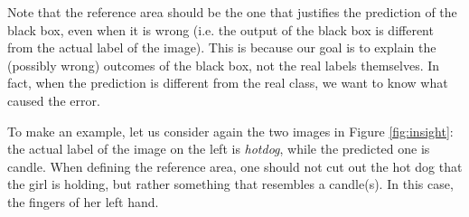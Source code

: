 \documentclass[12pt, twoside, a4paper]{report}
\begin{document}
Note that the reference area should be the one that justifies the prediction of the black box, even when it is wrong (i.e. the output of the black box is different from the actual label of the image). This is because our goal is to explain the (possibly wrong) outcomes of the black box, not the real labels themselves. In fact, when the prediction is different from the real class, we want to know what caused the error. 

To make an example, let us consider again the two images in Figure \ref{fig:insight}: the actual label of the image on the left is \textit{hotdog}, while the predicted one is candle. When defining the reference area, one should not cut out the hot dog that the girl is holding, but rather something that resembles a candle(s). In this case, the fingers of her left hand.
\end{document}
